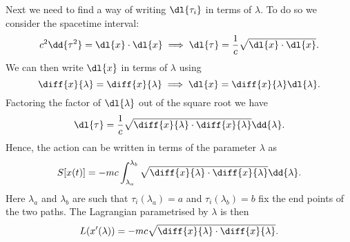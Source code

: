 \documentclass[fleqn]{NotesClass}
\newcommand*{\lagrangian}{L}
\begin{document}
    Next we need to find a way of writing \(\dl{\tau_i}\) in terms of \(\lambda\).
    To do so we consider the spacetime interval:
    \begin{equation}
        c^2\dd{\tau^2} = \dl{x} \cdot \dl{x} \implies \dl{\tau} = \frac{1}{c}\sqrt{\dl{x}\cdot\dl{x}}.
    \end{equation}
    We can then write \(\dl{x}\) in terms of \(\lambda\) using
    \begin{equation}
        \diff{x}{\lambda} = \diff{x}{\lambda} \implies \dl{x} = \diff{x}{\lambda}\dl{\lambda}.
    \end{equation}
    Factoring the factor of \(\dl{\lambda}\) out of the square root we have
    \begin{equation}
        \dl{\tau} = \frac{1}{c}\sqrt{\diff{x}{\lambda} \cdot \diff{x}{\lambda}} \dd{\lambda}.
    \end{equation}
    Hence, the action can be written in terms of the parameter \(\lambda\) as
    \begin{equation}\label{eqn:relativistic action in terms of lambda}
        S[x(t)] = -mc \int_{\lambda_a}^{\lambda_b} \sqrt{\diff{x}{\lambda} \cdot \diff{x}{\lambda}} \dd{\lambda}.
    \end{equation}
    Here \(\lambda_a\) and \(\lambda_b\) are such that \(\tau_i(\lambda_a) = a\) and \(\tau_i(\lambda_b) = b\) fix the end points of the two paths.
    The Lagrangian parametrised by \(\lambda\) is then
    \begin{equation}
        \lagrangian(x'(\lambda)) = -mc\sqrt{\diff{x}{\lambda}\cdot\diff{x}{\lambda}}.
    \end{equation}
\end{document}
